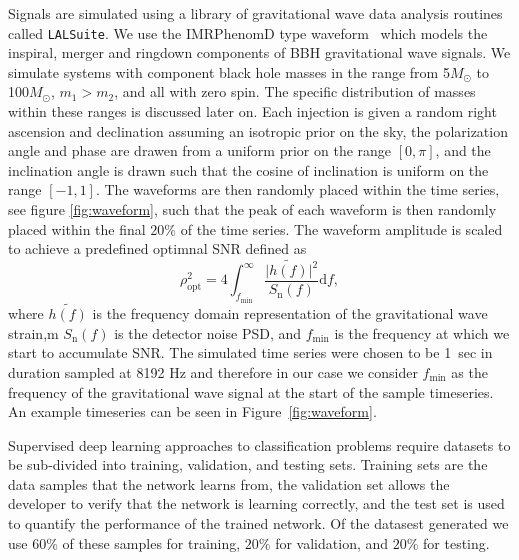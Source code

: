 \documentclass[%
 amsmath,amssymb,
 aps,
 twocolumn,
 prl,
 reprint,
floatfix,
]{revtex4-1}
\begin{document}
%
%
Signals are simulated using a library of gravitational wave data analysis
routines called \texttt{LALSuite}. We use the IMRPhenomD type
waveform~\cite{PhysRevD.93.044006, PhysRevD.93.044007} which models the
inspiral, merger and ringdown components of \ac{BBH} gravitational wave
signals. We simulate systems with component black hole masses in the range from
5\(M_\odot\) to 100\(M_\odot\), $m_{1} > m_{2}$, and all with zero spin. The
specific distribution of masses within these ranges is discussed later on. Each
injection is given a random right ascension and declination assuming an
isotropic prior on the sky, the polarization angle and phase are drawen from a
uniform prior on the range $[0,\pi]$, and the inclination angle is drawn such
that the cosine of inclination is uniform on the range $[-1,1]$. The waveforms
are then randomly placed within the time series, see figure \ref{fig:waveform},
such that the peak of each waveform is then randomly placed within the final $ 20\% $ of the time series. The waveform amplitude is scaled to achieve a predefined optimnal
\ac{SNR} defined as
%
%
\begin{equation} \label{eq:snr} \rho_{\mathrm{opt}}^{2} = 4
\int_{f_{\mathrm{min}}}^{\infty} \frac{\lvert
\tilde{h(f)}\rvert^{2}}{S_{\mathrm{n}}(f)} \mathrm{d}f, \end{equation}
%
where $\tilde{h(f)}$ is the frequency domain representation of the
gravitational wave strain,m $S_{\mathrm{n}}(f)$ is the detector noise \ac{PSD},
and $f_{\mathrm{min}}$ is the frequency at which we start to accumulate
\ac{SNR}. The simulated time series were chosen to be 1~sec in duration sampled
at 8192 Hz and therefore in our case we consider $f_{\mathrm{min}}$ as the
frequency of the gravitational wave signal at the start of the sample
timeseries. An example timeseries can be seen in Figure~\ref{fig:waveform}. 

%
%
Supervised deep learning approaches to classification problems require
datasets to be sub-divided into training, validation, and testing sets.
Training sets are the data samples that the network learns from, the validation
set allows the developer to verify that the network is learning correctly, and
the test set is used to quantify the performance of the trained network.
Of the datasest generated we use $60\%$ of these samples for training,
$20\%$ for validation, and $20\%$ for testing.
\end{document}
